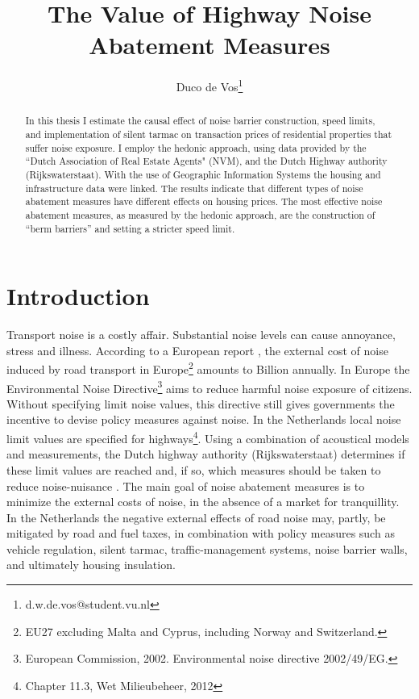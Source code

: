 \documentclass[12pt,a4paper]{scrartcl}
\title{The Value of Highway Noise Abatement Measures}
\author{Duco de Vos\thanks{d.w.de.vos@student.vu.nl}}
\affil{Vrije Universiteit Amsterdam}
\begin{document}
	
	\maketitle
	
	\begin{abstract}
	
	In this thesis I estimate the causal effect of noise barrier construction, speed limits, and implementation of silent tarmac on transaction prices of residential properties that suffer noise exposure. I employ the hedonic approach, using data provided by the ``Dutch Association of Real Estate Agents" (NVM), and the Dutch Highway authority (Rijkswaterstaat). With the use of Geographic Information Systems the housing and infrastructure data were linked. The results indicate that different types of noise abatement measures have different effects on housing prices. The most effective noise abatement measures, as measured by the hedonic approach, are the construction of ``berm barriers'' and setting a stricter speed limit. 
		
	\end{abstract}
	
	\section{Introduction}
	\label{sec:intro}
	
	Transport noise is a costly affair. Substantial noise levels can cause annoyance, stress and illness. According to a European report \citep{CEDelft2011}, the external cost of noise induced by road transport in Europe\footnote{EU27 excluding Malta and Cyprus, including Norway and Switzerland.} amounts to  Billion annually. In Europe the Environmental Noise Directive\footnote{European Commission, 2002. Environmental noise directive 2002/49/EG.} aims to reduce harmful noise exposure of citizens. Without specifying limit noise values, this directive still gives governments the incentive to devise policy measures against noise. In the Netherlands local noise limit values are specified for highways\footnote{Chapter 11.3, Wet Milieubeheer, 2012}. Using a combination of acoustical models and measurements, the Dutch highway authority (Rijkswaterstaat) determines if these limit values are reached and, if so, which measures should be taken to reduce noise-nuisance \citep{DeVos2015}. The main goal of noise abatement measures is to minimize the external costs of noise, in the absence of a market for tranquillity. In the Netherlands the negative external effects of road noise may, partly, be mitigated by road and fuel taxes, in combination with policy measures such as vehicle regulation, silent tarmac, traffic-management systems, noise barrier walls, and ultimately housing insulation\citep{RIVM2001}. 
	
\end{document}
